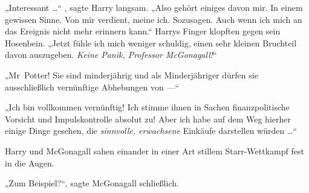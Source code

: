 „Interessant …“ , sagte Harry langsam.
„Also gehört einiges davon mir. In einem gewissen Sinne. Von mir verdient, meine ich. Sozusagen. Auch wenn ich mich an das Ereignis nicht mehr erinnern kann.“ Harrys Finger klopften gegen sein Hosenbein.
„Jetzt fühle ich mich weniger schuldig, einen sehr kleinen Bruchteil davon auszugeben. \emph{Keine Panik, Professor McGonagall!}“

„Mr~Potter! Sie sind minderjährig und als Minderjähriger dürfen sie ausschließlich vernünftige Abhebungen von —“

„Ich bin vollkommen vernünftig! Ich stimme ihnen in Sachen finanzpolitische Vorsicht und Impulskontrolle absolut zu! Aber ich habe auf dem Weg hierher einige Dinge gesehen, die \emph{sinnvolle, erwachsene} Einkäufe darstellen würden …“

Harry und McGonagall sahen einander in einer Art stillem Starr-Wettkampf fest in die Augen.

„Zum Beispiel?“, sagte McGonagall schließlich.

